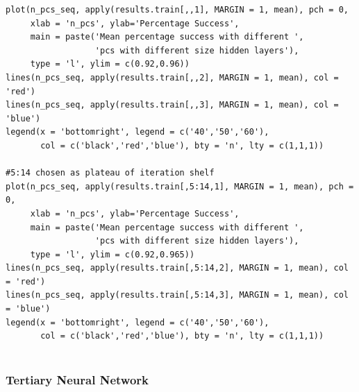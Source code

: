 \documentclass[11pt]{article} %
\begin{document}
\begin{lstlisting}
plot(n_pcs_seq, apply(results.train[,,1], MARGIN = 1, mean), pch = 0, 
     xlab = 'n_pcs', ylab='Percentage Success', 
     main = paste('Mean percentage success with different ',
                  'pcs with different size hidden layers'), 
     type = 'l', ylim = c(0.92,0.96))
lines(n_pcs_seq, apply(results.train[,,2], MARGIN = 1, mean), col = 'red')
lines(n_pcs_seq, apply(results.train[,,3], MARGIN = 1, mean), col = 'blue')
legend(x = 'bottomright', legend = c('40','50','60'), 
       col = c('black','red','blue'), bty = 'n', lty = c(1,1,1))

#5:14 chosen as plateau of iteration shelf
plot(n_pcs_seq, apply(results.train[,5:14,1], MARGIN = 1, mean), pch = 0, 
     xlab = 'n_pcs', ylab='Percentage Success', 
     main = paste('Mean percentage success with different ',
                  'pcs with different size hidden layers'), 
     type = 'l', ylim = c(0.92,0.965))
lines(n_pcs_seq, apply(results.train[,5:14,2], MARGIN = 1, mean), col = 'red')
lines(n_pcs_seq, apply(results.train[,5:14,3], MARGIN = 1, mean), col = 'blue')
legend(x = 'bottomright', legend = c('40','50','60'), 
       col = c('black','red','blue'), bty = 'n', lty = c(1,1,1))


\end{lstlisting}

\vspace{5mm}

\subsubsection{Tertiary Neural Network}
\label{code-tert_nnet}
\end{document}
